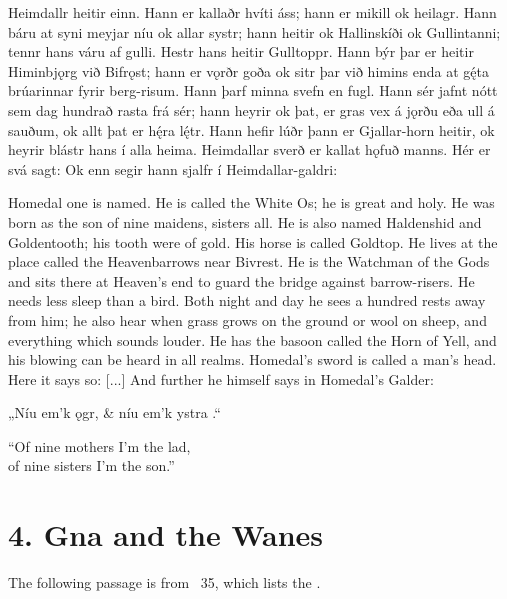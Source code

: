 \sectionline

\bpg\bpa[0]%
Heimdallr heitir einn. Hann er kallaðr hvíti áss; hann er mikill ok heilagr. Hann báru at syni meyjar níu ok allar systr; hann heitir ok Hallinskíði ok Gullintanni; tennr hans váru af gulli. Hestr hans heitir Gulltoppr. Hann býr þar er heitir Himinbjǫrg við Bifrǫst; hann er vǫrðr goða ok sitr þar við himins enda at gę́ta brúarinnar fyrir berg-risum. Hann þarf minna svefn en fugl. Hann sér jafnt nótt sem dag hundrað rasta frá sér; hann heyrir ok þat, er gras vex á jǫrðu eða ull á sauðum, ok allt þat er hę́ra lę́tr. Hann hefir lúðr þann er Gjallar-horn heitir, ok heyrir blástr hans í alla heima. Heimdallar sverð er kallat hǫfuð manns. Hér er svá sagt:  Ok enn segir hann sjalfr í Heimdallar-galdri:\epa

\bpb Homedal one is named.  He is called the White Os; he is great and holy.  He was born as the son of nine maidens, sisters all.  He is also named Haldenshid and Goldentooth; his tooth were of gold.  His horse is called Goldtop.  He lives at the place called the Heavenbarrows near Bivrest.  He is the Watchman of the Gods and sits there at Heaven’s end to guard the bridge against barrow-risers.  He needs less sleep than a bird.  Both night and day he sees a hundred rests away from him; he also hear when grass grows on the ground or wool on sheep, and everything which sounds louder. He has the basoon called the Horn of Yell, and his blowing can be heard in all realms.  Homedal’s sword is called a man’s head.  Here it says so: [...] And further he himself says in Homedal’s Galder:\epb\epg


\bvg\bva[][10]%
„Níu em’k  ǫgr, &
níu em’k ystra .“\eva

\bvb “Of nine mothers I’m the lad, \\
of nine sisters I’m the son.”\evb\evg

\sectionline

\section{4. Gna and the Wanes}

The following passage is from \Gylfaginning\ 35, which lists the .

\sectionline

